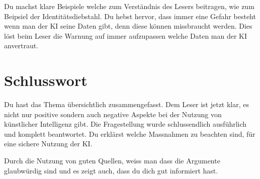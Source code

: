 \documentclass{article}
\begin{document}
\vspace{2mm} Du machst klare Beispiele welche zum Verständnis des Lesers beitragen, wie zum Beipsiel der Identitätsdiebstahl. Du hebst hervor, dass immer eine Gefahr besteht wenn man der KI seine Daten gibt, denn diese können missbraucht werden. Dies löst beim Leser die Warnung auf immer aufzupassen welche Daten man der KI anvertraut.


\section{Schlusswort}

Du hast das Thema übersichtlich zusammengefasst. Dem Leser ist jetzt klar, es nicht nur positive sondern auch negative Aspekte bei der Nutzung von künstlicher Intelligenz gibt. Die Fragestellung wurde schlussendlich ausführlich und komplett beantwortet. Du erklärst welche Massnahmen zu beachten sind, für eine sichere Nutzung der KI. 

\vspace{2mm} Durch die Nutzung von guten Quellen, weiss man dass die Argumente glaubwürdig sind und es zeigt auch, dass du dich gut informiert hast.

\printbibliography
\end{document}
